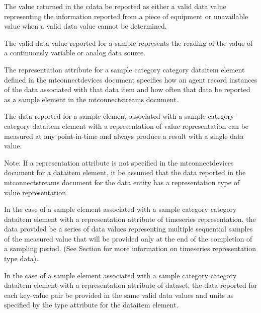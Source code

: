 \documentclass{mtconnect}	%
\providecommand{\DIFadd}[1]{{\hspace{0pt}\protect\color{blue}#1}} %
\providecommand{\DIFaddbegin}{} %
\begin{document}
The value returned in the \gls{cdata} \must be reported as either a \gls{valid data value} representing the information reported from a piece of equipment or \gls{unavailable value} when a \gls{valid data value} cannot be determined.

The \gls{valid data value} reported for a \gls{sample} represents the reading of the value of a continuously variable or analog data source.

The \gls{representation} attribute for a \gls{sample category} category \gls{dataitem} element defined in the \gls{mtconnectdevices} document specifies how an \gls{agent} \must record instances of the data associated with that data item and how often that data \must be reported as a \gls{sample} element in the \gls{mtconnectstreams} document.

The data reported for a \gls{sample} element associated with a \gls{sample category} category \gls{dataitem} element with a \gls{representation} of \gls{value representation} can be measured at any point-in-time and \must always produce a result with a single data value.  

\begin{note}
Note: If a \gls{representation} attribute is not specified in the \gls{mtconnectdevices} document for a \gls{dataitem} element, it \must be assumed that the data reported in the \gls{mtconnectstreams} document for the \gls{data entity} has a \gls{representation} type of \gls{value representation}.

\end{note}

In the case of a \gls{sample} element associated with a \gls{sample category} category \gls{dataitem} element with a \gls{representation} attribute of \gls{timeseries representation}, the data provided \must be a series of data values representing multiple sequential samples of the measured value that will be provided only at the end of the completion of a sampling period.   (See Section  for more information on \gls{timeseries representation} type data).

\DIFaddbegin \DIFadd{In the case of a \gls{sample} element associated with a \gls{sample category} category \gls{dataitem} element with a \gls{representation} attribute of \gls{dataset}, the data reported for each \gls{key-value pair} \MUST be provided in the same \glspl{valid data value} and units as specified by the \gls{type} attribute for the \gls{dataitem} element.
}
\end{document}
